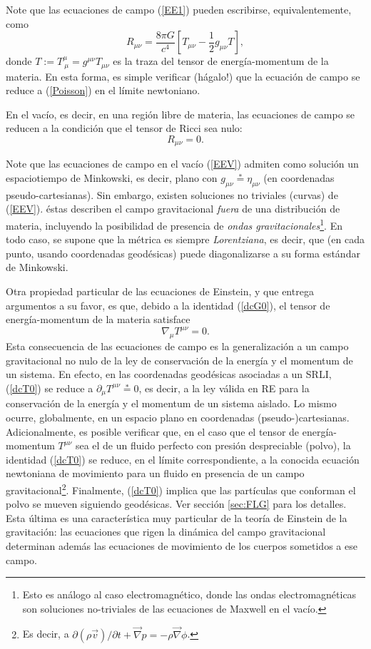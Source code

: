 Note que las ecuaciones de campo (\ref{EE1}) pueden escribirse, equivalentemente, como
\begin{equation}\label{EE3}
 R_{\mu\nu}=\frac{8\pi G}{c^4}\left[ T_{\mu\nu}-\frac{1}{2}g_{\mu\nu}T\right],
\end{equation}
donde $T:=T^\mu_{\ \mu}=g^{\mu\nu}T_{\mu\nu}$ es la traza del tensor de
energía-momentum de la materia. En esta forma, es simple verificar (hágalo!) que la ecuación de campo se reduce a (\ref{Poisson}) en el límite newtoniano.

En el vacío, es decir, en una región libre de materia, las ecuaciones de
campo se reducen a la condición que el tensor de Ricci sea nulo:
\begin{equation}
 R_{\mu\nu}=0. \label{EEV}
\end{equation}

Note que las ecuaciones de campo en el vacío (\ref{EEV}) admiten como
solución un espaciotiempo de Minkowski, es decir, plano con
$g_{\mu\nu}\stackrel{*}{=}\eta_{\mu\nu}$ (en coordenadas pseudo-cartesianas). Sin embargo, existen soluciones no triviales (curvas) de (\ref{EEV}). éstas describen el campo
gravitacional \textit{fuera} de una distribución de materia, incluyendo la posibilidad
de presencia de \textit{ondas gravitacionales}\footnote{Esto es análogo al
caso electromagnético, donde las ondas electromagnéticas son soluciones
no-triviales de las ecuaciones de Maxwell en el vacío.}. En todo caso, se
supone que la métrica es siempre \textit{Lorentziana}, es decir, que (en cada
punto, usando coordenadas geodésicas) puede diagonalizarse a su forma estándar
de Minkowski.

Otra propiedad particular de las ecuaciones de Einstein, y que entrega argumentos a su favor, es que, debido a la identidad (\ref{dcG0}), el tensor de energía-momentum de la materia satisface
\begin{equation}
 \nabla_\mu T^{\mu\nu}= 0. \label{dcT0}
\end{equation}
Esta consecuencia de las ecuaciones de campo es la generalización a un campo
gravitacional no nulo de la ley de conservación de la energía y el momentum
de un sistema. En efecto, en las coordenadas geodésicas asociadas a un SRLI,  (\ref{dcT0}) se reduce a $\partial_\mu T^{\mu\nu}\stackrel{*}{=}0$, es decir, a la ley válida en RE para la conservación de la energía y el momentum de un sistema aislado. Lo mismo ocurre, globalmente, en un espacio plano en coordenadas (pseudo-)cartesianas. Adicionalmente, es posible verificar que, en el caso que el tensor de energía-momentum $T^{\mu\nu}$ sea el de un fluido perfecto con presión despreciable (polvo), la identidad (\ref{dcT0}) se reduce, en el límite correspondiente, a la conocida ecuación newtoniana de movimiento para un fluido en presencia de un campo gravitacional\footnote{Es decir, a $\partial(\rho\vec{v})/\partial t+\vec\nabla p=-\rho\vec\nabla\phi$.}. Finalmente, (\ref{dcT0}) implica que las partículas que conforman el polvo se mueven siguiendo geodésicas. Ver sección \ref{sec:FLG} para los detalles. Esta última es una característica muy particular de la teoría de Einstein de la gravitación: las ecuaciones que rigen la dinámica del campo gravitacional determinan además las ecuaciones de movimiento de los cuerpos sometidos a ese campo.


